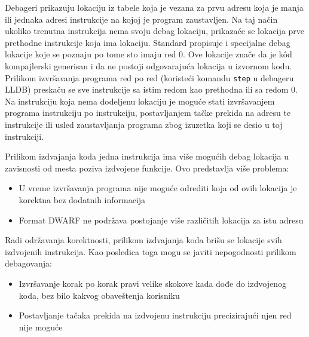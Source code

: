 \documentclass[12pt,oneside]{memoir}
\begin{document}
Debageri prikazuju lokaciju iz tabele koja je vezana za prvu adresu koja je manja ili jednaka adresi instrukcije na kojoj je program zaustavljen.
Na taj način ukoliko trenutna instrukcija nema svoju debag lokaciju, prikazaće se lokacija prve prethodne instrukcije koja ima lokaciju.
Standard propisuje i specijalne debag lokacije koje se poznaju po tome sto imaju red 0.
Ove lokacije znače da je k\^od kompajlerski generisan i da ne postoji odgovarajuća lokacija u izvornom kodu.
Prilikom izvršavanja programa red po red (koristeći komandu \verb|step| u debageru LLDB) preskaču se sve instrukcije sa istim redom kao prethodna ili sa redom 0. 
Na instrukciju koja nema dodeljenu lokaciju je moguće stati izvršavanjem programa instrukciju po instrukciju, postavljanjem tačke prekida na adresu te instrukcije ili usled zaustavljanja programa zbog izuzetka koji se desio u toj instrukciji.


Prilikom izdvajanja koda jedna instrukcija ima više mogućih debag lokacija u zavisnosti od mesta poziva izdvojene funkcije.
Ovo predstavlja više problema:
\begin{itemize}
  \item U vreme izvršavanja programa nije moguće odrediti koja od ovih lokacija je korektna bez dodatnih informacija
  \item Format DWARF ne podržava postojanje više različitih lokacija za istu adresu \cite{dwarf5}
\end{itemize}
Radi održavanja korektnosti, prilikom izdvajanja koda brišu se lokacije svih izdvojenih instrukcija.
Kao posledica toga mogu se javiti nepogodnosti prilikom debagovanja:
\begin{itemize}
  \item Izvršavanje korak po korak pravi velike skokove kada dođe do izdvojenog koda, bez bilo kakvog obaveštenja korisniku
  \item Postavljanje tačaka prekida na izdvojenu instrukciju precizirajući njen red nije moguće
\end{itemize}
\end{document}

